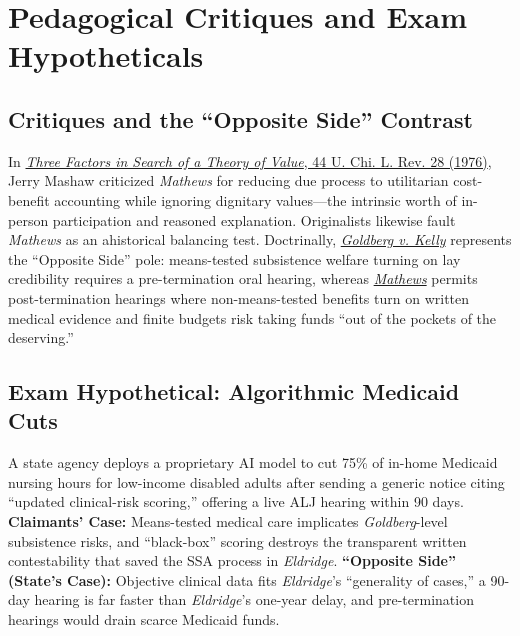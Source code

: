 \documentclass[12pt]{article}
\begin{document}
\section{Pedagogical Critiques and Exam Hypotheticals}

\subsection{Critiques and the ``Opposite Side'' Contrast}
In \href{https://chicagounbound.uchicago.edu/uclrev/vol44/iss1/5/}{\emph{Three Factors in Search of a Theory of Value}, 44 U. Chi. L. Rev. 28 (1976)}, Jerry Mashaw criticized \emph{Mathews} for reducing due process to utilitarian cost-benefit accounting while ignoring dignitary values---the intrinsic worth of in-person participation and reasoned explanation. Originalists likewise fault \emph{Mathews} as an ahistorical balancing test. Doctrinally, \href{https://supreme.justia.com/cases/federal/us/397/254/}{\emph{Goldberg v. Kelly}} represents the ``Opposite Side'' pole: means-tested subsistence welfare turning on lay credibility requires a pre-termination oral hearing, whereas \href{https://supreme.justia.com/cases/federal/us/424/319/}{\emph{Mathews}} permits post-termination hearings where non-means-tested benefits turn on written medical evidence and finite budgets risk taking funds ``out of the pockets of the deserving.''

\subsection{Exam Hypothetical: Algorithmic Medicaid Cuts}
A state agency deploys a proprietary AI model to cut 75\% of in-home Medicaid nursing hours for low-income disabled adults after sending a generic notice citing ``updated clinical-risk scoring,'' offering a live ALJ hearing within 90 days. \textbf{Claimants' Case:} Means-tested medical care implicates \emph{Goldberg}-level subsistence risks, and ``black-box'' scoring destroys the transparent written contestability that saved the SSA process in \emph{Eldridge}. \textbf{``Opposite Side'' (State's Case):} Objective clinical data fits \emph{Eldridge}'s ``generality of cases,'' a 90-day hearing is far faster than \emph{Eldridge}'s one-year delay, and pre-termination hearings would drain scarce Medicaid funds.
\end{document}
